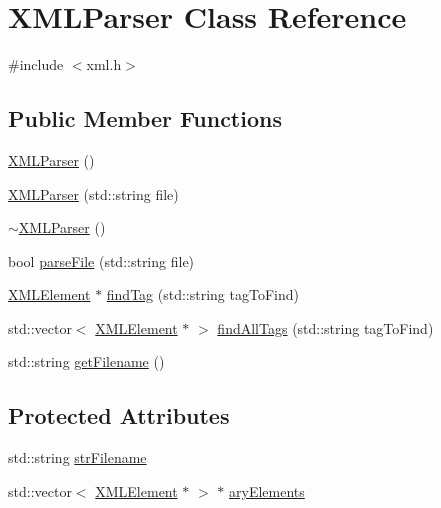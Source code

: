 \hypertarget{class_x_m_l_parser}{\section{X\-M\-L\-Parser Class Reference}
\label{class_x_m_l_parser}
}


{\ttfamily \#include $<$xml.\-h$>$}

\subsection*{Public Member Functions}
\begin{DoxyCompactItemize}
\item 
\hyperlink{class_x_m_l_parser_a60004d4b50ef242bbd191a494fd750f1}{X\-M\-L\-Parser} ()
\item 
\hyperlink{class_x_m_l_parser_a899905c7d9fb489cc16fb9c22ffd9651}{X\-M\-L\-Parser} (std\-::string file)
\item 
\hyperlink{class_x_m_l_parser_af833ecdb0e07ead08dfda925b4af86ad}{$\sim$\-X\-M\-L\-Parser} ()
\item 
bool \hyperlink{class_x_m_l_parser_a48e67e5924ed40b94c7ee21f3dea0bd3}{parse\-File} (std\-::string file)
\item 
\hyperlink{class_x_m_l_element}{X\-M\-L\-Element} $\ast$ \hyperlink{class_x_m_l_parser_a3ee6b721229db445683f29726e05bdfc}{find\-Tag} (std\-::string tag\-To\-Find)
\item 
std\-::vector$<$ \hyperlink{class_x_m_l_element}{X\-M\-L\-Element} $\ast$ $>$ \hyperlink{class_x_m_l_parser_a3c38f0902d8729a7388fd748e7a3a247}{find\-All\-Tags} (std\-::string tag\-To\-Find)
\item 
std\-::string \hyperlink{class_x_m_l_parser_adb7595b44f97dbf9d1cf349550deedb0}{get\-Filename} ()
\end{DoxyCompactItemize}
\subsection*{Protected Attributes}
\begin{DoxyCompactItemize}
\item 
std\-::string \hyperlink{class_x_m_l_parser_a7eb60e2a223b32c561bf5ca759ac3786}{str\-Filename}
\item 
std\-::vector$<$ \hyperlink{class_x_m_l_element}{X\-M\-L\-Element} $\ast$ $>$ $\ast$ \hyperlink{class_x_m_l_parser_a15b918c0da7ca92c9c6b1bc2942e06f1}{ary\-Elements}
\end{DoxyCompactItemize}


